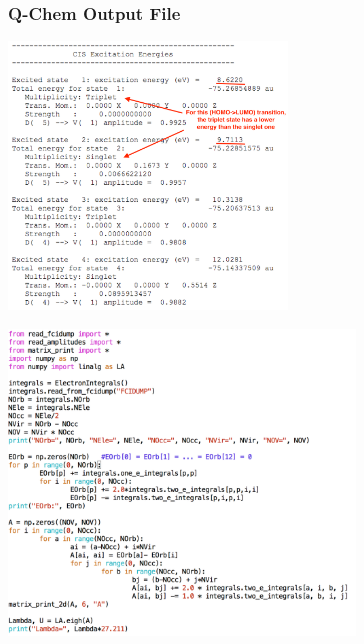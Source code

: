 \documentclass{beamer} %
\begin{document}
\begin{frame}
\frametitle{Q-Chem Output File} 
\begin{center}
\includegraphics[height=2.8in]{figures/cis-output.png}
\end{center}
\end{frame}

\begin{frame}[fragile]
\begin{center}
\includegraphics[height=3.2in]{figures/cis-diag.png} 
\end{center}
\end{frame}
\end{document}

